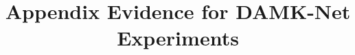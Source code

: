 \documentclass[11pt]{article}
\title{Appendix Evidence for DAMK-Net Experiments}
\author{}
\date{}
\begin{document}
\maketitle

\newcommand{\appendixevidencedir}{report_images/appendix_evidence}

\end{document}
